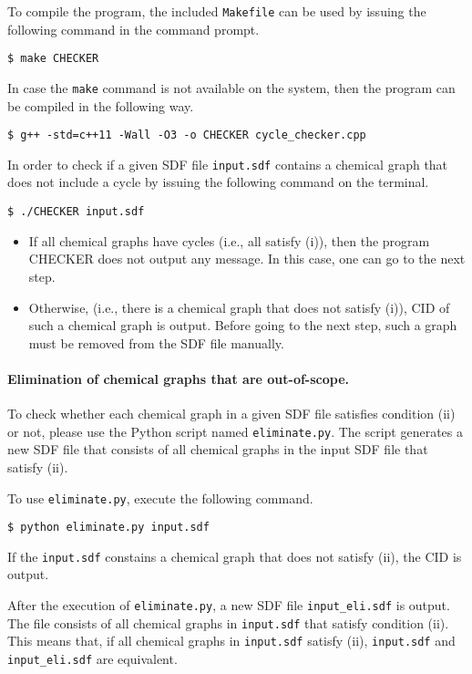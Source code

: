 \documentclass[11pt, titlepage, dvipdfmx, twoside]{article}
\begin{document}
To compile the program, the included {\tt Makefile}
can be used by issuing the following command in the command prompt.
\begin{oframed}
{\small
\verb|$ make CHECKER|
}
\end{oframed}
%
In case the {\tt make} command is not available on the system,
then the program can be compiled in the following way.
\begin{oframed}
{\small
\verb|$ g++ -std=c++11 -Wall -O3 -o CHECKER cycle_checker.cpp|
}
\end{oframed}

In order to check if a given
SDF file {\tt input.sdf} contains a chemical graph that does not include
a cycle by issuing the following command on the terminal.
\begin{oframed}
{\small
\verb|$ ./CHECKER input.sdf|
}
\end{oframed}


\begin{itemize}
\item If all chemical graphs have cycles
  (i.e., all satisfy (i)),
  then the program CHECKER does not output any message.
  In this case, one can go to the next step. 
\item Otherwise, (i.e., there is a chemical graph that does not satisfy (i)),
  CID of such a chemical graph is output.
  Before going to the next step,
  such a graph must be removed from the SDF file manually.  
\end{itemize}

\paragraph{Elimination of chemical graphs that are out-of-scope.}
To check whether each chemical graph in a given SDF file
satisfies condition (ii) or not,
please use the Python script named 
{\tt eliminate.py}.
The script generates a new SDF file
that consists of all chemical graphs in the input SDF file
that satisfy (ii). 

To use {\tt eliminate.py}, execute the following command. 

\begin{oframed}
{\small
\verb|$ python eliminate.py input.sdf|
}
\end{oframed}

If the {\tt input.sdf} constains a chemical graph
that does not satisfy (ii), the CID is output.

After the execution of {\tt eliminate.py},
a new SDF file {\tt input\_eli.sdf} is output.
The file consists of all chemical graphs in {\tt input.sdf}
that satisfy condition (ii).
%
This means that, if all chemical graphs in {\tt input.sdf}
satisfy (ii), 
{\tt input.sdf} and {\tt input\_eli.sdf} are equivalent. 
\end{document}
